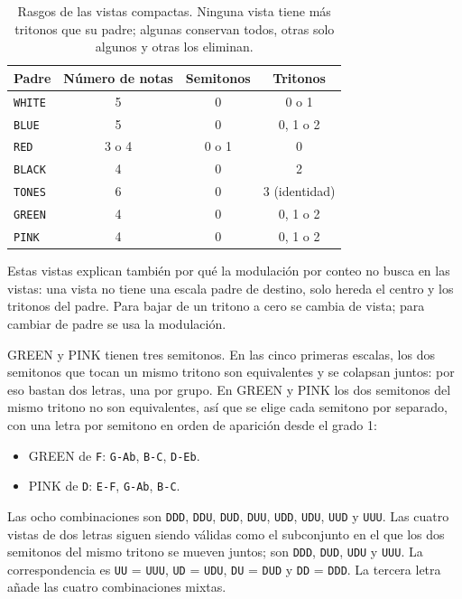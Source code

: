 \documentclass[]{report}
\begin{document}
\begin{table}[H]
	\centering
	\begin{tabular}{lccc}
		\toprule
		Padre & Número de notas & Semitonos & Tritonos \\
		\midrule
		\texttt{WHITE} & 5 & 0 & 0 o 1 \\
		\texttt{BLUE}  & 5 & 0 & 0, 1 o 2 \\
		\texttt{RED}   & 3 o 4 & 0 o 1 & 0 \\
		\texttt{BLACK} & 4 & 0 & 2 \\
		\texttt{TONES} & 6 & 0 & 3 (identidad) \\
		\texttt{GREEN} & 4 & 0 & 0, 1 o 2 \\
		\texttt{PINK}  & 4 & 0 & 0, 1 o 2 \\
		\bottomrule
	\end{tabular}
	\caption{Rasgos de las vistas compactas. Ninguna vista tiene más tritonos
	que su padre; algunas conservan todos, otras solo algunos y otras los eliminan.}
	\label{tab:collapse-view-traits}
\end{table}

Estas vistas explican también por qué la modulación por conteo no busca en las
vistas: una vista no tiene una escala padre de destino, solo hereda el centro y
los tritonos del padre. Para bajar de un tritono a cero se cambia de vista; para
cambiar de padre se usa la modulación.

\textsf{GREEN} y \textsf{PINK} tienen tres semitonos. En las cinco primeras escalas, los dos semitonos que tocan un mismo
tritono son equivalentes y se colapsan juntos:
por eso bastan dos letras, una por grupo. En \textsf{GREEN} y \textsf{PINK} los
dos semitonos del mismo tritono no son equivalentes, así que se elige cada
semitono por separado, con una letra por semitono en orden de aparición desde el
grado 1:

\begin{itemize}
	\item \textsf{GREEN} de \texttt{F}: \texttt{G-Ab}, \texttt{B-C},
	\texttt{D-Eb}.
	\item \textsf{PINK} de \texttt{D}: \texttt{E-F}, \texttt{G-Ab},
	\texttt{B-C}.
\end{itemize}

Las ocho combinaciones son \texttt{DDD}, \texttt{DDU}, \texttt{DUD},
\texttt{DUU}, \texttt{UDD}, \texttt{UDU}, \texttt{UUD} y \texttt{UUU}. Las
cuatro vistas de dos letras siguen siendo válidas como el subconjunto en el que
los dos semitonos del mismo tritono se mueven juntos; son \texttt{DDD},
\texttt{DUD}, \texttt{UDU} y \texttt{UUU}. La correspondencia es \texttt{UU} =
\texttt{UUU}, \texttt{UD} = \texttt{UDU}, \texttt{DU} = \texttt{DUD} y
\texttt{DD} = \texttt{DDD}. La tercera letra añade las cuatro combinaciones
mixtas.
\end{document}
